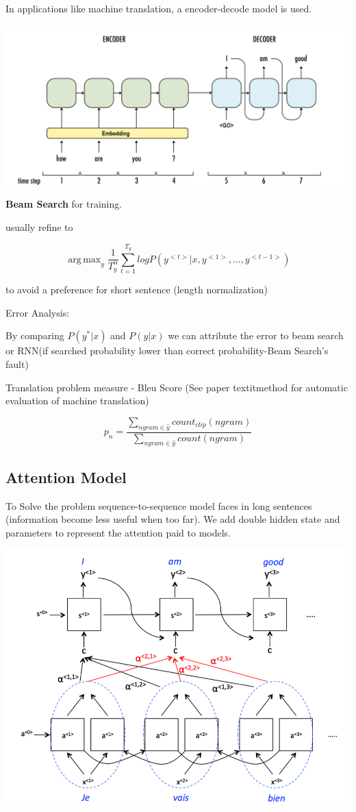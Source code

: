 \documentclass[11pt, openany]{book}              %
\DeclareMathOperator*{\argmax}{arg\,max}  %
\begin{document}
In applications like machine translation, a encoder-decode model is used.

\includegraphics[width=15cm]{SequenceToSequence.png}

\textbf{Beam Search} for training. 

usually refine to

$$\argmax_y  \frac{1}{T_y^{\alpha}} \sum_{t=1}^{T_y} log P(y^{<t>} | x, y^{<1>},...,y^{<t-1>})$$

to avoid a preference for short sentence (length normalization)

Error Analysis:

By comparing $P(y^* |x)$ and $P(\hat{y}|x)$ we can attribute the error to beam search or RNN(if searched probability lower than correct probability-Beam Search’s fault)

Translation problem measure - Bleu Score (See paper  textit{method for automatic evaluation of machine translation})

$$p_n = \frac{\sum_{ngram \in \hat{y}} count_{clip} (ngram)}{\sum_{ngram \in \hat{y}}count(ngram)}$$

\subsection{Attention Model}

To Solve the problem sequence-to-sequence model faces in long sentences (information become less useful when too far). We add double hidden state and parameters to represent the attention paid to models.

\includegraphics[width=15cm]{AttentionModel.png}
\end{document}
